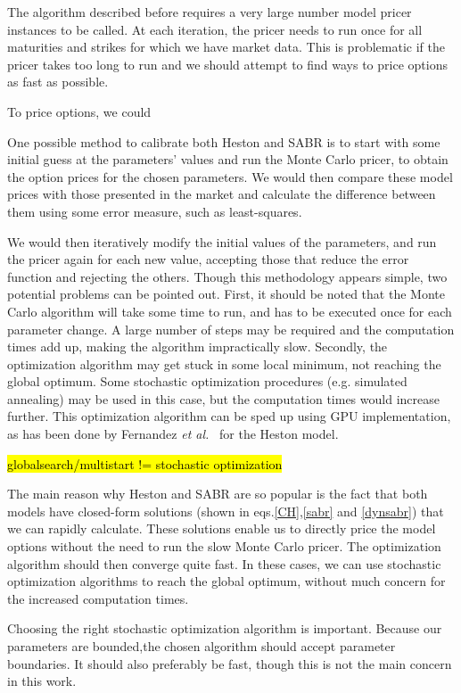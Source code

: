 The algorithm described before requires a very large number model pricer instances to be called. At each iteration, the pricer needs to run once for all maturities and strikes for which we have market data. This is problematic if the pricer takes too long to run and we should attempt to find ways to price options as fast as possible.

To price options, we could


One possible method to calibrate both Heston and SABR is to start with some initial guess at the parameters' values and run the Monte Carlo pricer, to obtain the option prices for the chosen parameters. We would then compare these model prices with those presented in the market and calculate the difference between them using some error measure, such as least-squares.

We would then iteratively modify the initial values of the parameters, and run the pricer again for each new value, accepting those that reduce the error function and rejecting the others.
Though this methodology appears simple, two potential problems can be pointed out. First, it should be noted that the Monte Carlo algorithm will take some time to run, and has to be executed once for each parameter change. A large number of steps may be required and the computation times add up, making the algorithm impractically slow. Secondly, the optimization algorithm may get stuck in some local minimum, not reaching the global optimum. Some stochastic optimization procedures (e.g. simulated annealing) may be used in this case, but the computation times would increase further.
This optimization algorithm can be sped up using GPU implementation, as has been done by Fernandez \textit{et al.}~\cite{Fernandez} for the Heston model.

\hl{globalsearch/multistart != stochastic optimization}


The main reason why Heston and SABR are so popular is the fact that both models have closed-form solutions (shown in eqs.\eqref{CH},\eqref{sabr} and \eqref{dynsabr}) that we can rapidly calculate. These solutions enable us to directly price the model options without the need to run the slow Monte Carlo pricer. The optimization algorithm should then converge quite fast. In these cases, we can use stochastic optimization algorithms to reach the global optimum, without much concern for the increased computation times.

Choosing the right stochastic optimization algorithm is important. Because our parameters are bounded,the chosen algorithm should accept parameter boundaries. It should also preferably be fast, though this is not the main concern in this work.

